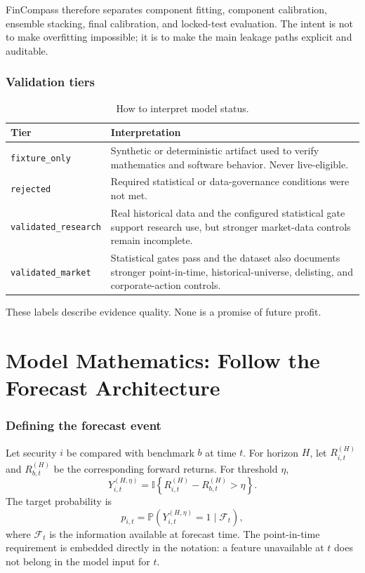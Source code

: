 \documentclass[11pt]{article}
\newcommand{\Prb}{\mathbb{P}}
\newcommand{\I}{\mathbb{I}}
\begin{document}
FinCompass therefore separates component fitting, component calibration, ensemble stacking, final calibration, and locked-test evaluation. The intent is not to make overfitting impossible; it is to make the main leakage paths explicit and auditable.

\section{Validation tiers}

\begin{table}[H]
\centering
\small
\caption{How to interpret model status.}
\begin{tabularx}{\textwidth}{@{}p{}X@{}}
\toprule
Tier & Interpretation \\
\midrule
\texttt{fixture\_only} & Synthetic or deterministic artifact used to verify mathematics and software behavior. Never live-eligible. \\
\texttt{rejected} & Required statistical or data-governance conditions were not met. \\
\texttt{validated\_research} & Real historical data and the configured statistical gate support research use, but stronger market-data controls remain incomplete. \\
\texttt{validated\_market} & Statistical gates pass and the dataset also documents stronger point-in-time, historical-universe, delisting, and corporate-action controls. \\
\bottomrule
\end{tabularx}
\end{table}

These labels describe evidence quality. None is a promise of future profit.

\part{Model Mathematics: Follow the Forecast Architecture}

\section{Defining the forecast event}

Let security $i$ be compared with benchmark $b$ at time $t$. For horizon $H$, let $R_{i,t}^{(H)}$ and $R_{b,t}^{(H)}$ be the corresponding forward returns. For threshold $\eta$,
\begin{equation}
Y_{i,t}^{(H,\eta)}=\I\left\{R_{i,t}^{(H)}-R_{b,t}^{(H)}>\eta\right\}.
\end{equation}
The target probability is
\begin{equation}
p_{i,t}=\Prb\left(Y_{i,t}^{(H,\eta)}=1\mid\mathcal F_t\right),
\end{equation}
where $\mathcal F_t$ is the information available at forecast time. The point-in-time requirement is embedded directly in the notation: a feature unavailable at $t$ does not belong in the model input for $t$.
\end{document}
